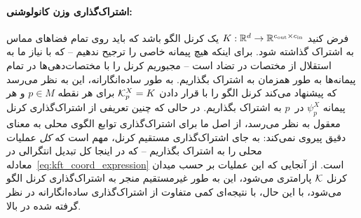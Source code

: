 \paragraph{اشتراک‌گذاری وزن کانولوشنی:}
فرض کنید $K: \mathbb{R}^d \to \mathbb{R}^{{c_\textup{out}}\times{c_\textup{in}}}$ یک کرنل الگو باشد که باید روی تمام فضاهای مماس به اشتراک گذاشته شود.
برای اینکه هیچ پیمانه خاصی را ترجیح ندهیم -- که با نیاز ما به استقلال از مختصات در تضاد است -- مجبوریم کرنل را با مختصات‌دهی‌ها در تمام پیمانه‌ها به طور همزمان به اشتراک بگذاریم.
به طور ساده‌انگارانه، این به نظر می‌رسد که پیشنهاد می‌کند کرنل الگو را با قرار دادن $\mathcal{K}_p^X = K$ برای هر نقطه $p\in M$ و هر پیمانه $\psi_p^X$ در~$p$ به اشتراک بگذاریم.
در حالی که چنین تعریفی از اشتراک‌گذاری کرنل معقول به نظر می‌رسد، از اصل ما برای اشتراک‌گذاری توابع الگوی محلی به معنای دقیق پیروی نمی‌کند:
به جای اشتراک‌گذاری مستقیم کرنل، مهم است که \emph{کل} عملیات محلی را به اشتراک بگذاریم -- که در اینجا کل
تبدیل انتگرالی در معادله~\eqref{eq:kft_coord_expression} است.
از آنجایی که این عملیات بر حسب میدان کرنل $\mathcal{K}$ پارامتری می‌شود، این به طور غیرمستقیم منجر به اشتراک‌گذاری کرنل الگو می‌شود، با این حال، با نتیجه‌ای کمی متفاوت از اشتراک‌گذاری ساده‌انگارانه در نظر گرفته شده در بالا.


